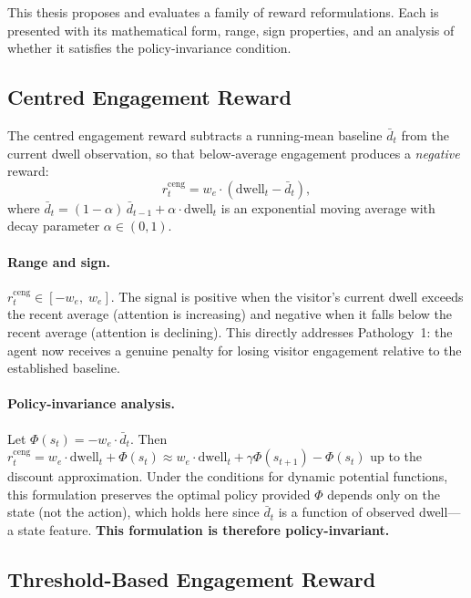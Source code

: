 \documentclass[12pt,a4paper]{article}
\newcommand{\rceng}{r^{\mathrm{ceng}}_t}
\begin{document}
This thesis proposes and evaluates a family of reward reformulations. Each is presented with its mathematical form, range, sign properties, and an analysis of whether it satisfies the policy-invariance condition.

\subsection{Centred Engagement Reward}
\label{sec:centred}

The centred engagement reward subtracts a running-mean baseline $\bar{d}_t$ from the current dwell observation, so that below-average engagement produces a \emph{negative} reward:
\begin{equation}
\label{eq:centred}
\rceng = w_e \cdot (\mathrm{dwell}_t - \bar{d}_t),
\end{equation}
where $\bar{d}_t = (1 - \alpha)\,\bar{d}_{t-1} + \alpha \cdot \mathrm{dwell}_t$ is an exponential moving average with decay parameter $\alpha \in (0,1)$.

\paragraph{Range and sign.} $\rceng \in [-w_e,\; w_e]$. The signal is positive when the visitor's current dwell exceeds the recent average (attention is increasing) and negative when it falls below the recent average (attention is declining). This directly addresses Pathology~1: the agent now receives a genuine penalty for losing visitor engagement relative to the established baseline.

\paragraph{Policy-invariance analysis.}
Let $\Phi(s_t) = -w_e \cdot \bar{d}_t$. Then $\rceng = w_e \cdot \mathrm{dwell}_t + \Phi(s_t) \approx w_e \cdot \mathrm{dwell}_t + \gamma\Phi(s_{t+1}) - \Phi(s_t)$ up to the discount approximation. Under the \citet{devlin2012} conditions for dynamic potential functions, this formulation preserves the optimal policy provided $\Phi$ depends only on the state (not the action), which holds here since $\bar{d}_t$ is a function of observed dwell---a state feature. \textbf{This formulation is therefore policy-invariant.}

\subsection{Threshold-Based Engagement Reward}
\end{document}
